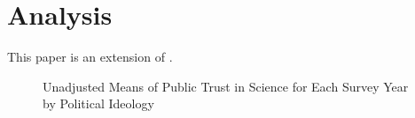 \documentclass[12pt, a4paper]{article}
\let\stdsection\section
\renewcommand\section{\newpage\stdsection}
\begin{document}
\section*{Analysis}

This paper is an extension of \cite{gauchat_politicization_2012}.



\begin{figure}[h]
	\caption{Unadjusted Means of Public Trust in Science for Each Survey Year by Political Ideology}
	
\end{figure}

\clearpage

\printbibliography
\end{document}
